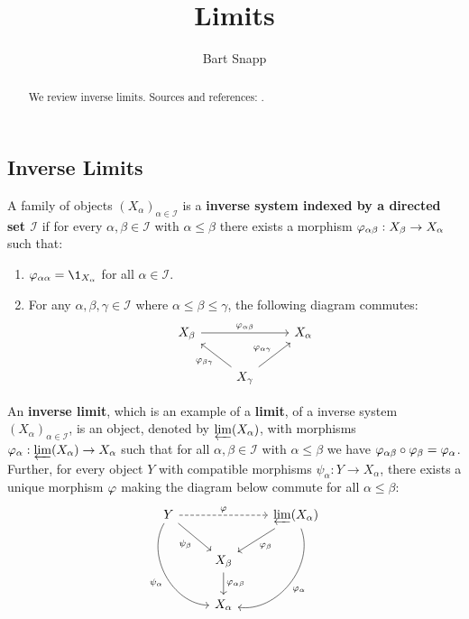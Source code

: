 \documentclass{ximera}
\author{Bart Snapp}
\title{Limits}
\begin{document}
  \begin{abstract}
    We review inverse limits.  Sources and references: \cite{sD2008}.
  \end{abstract}
\maketitle

\subsection{Inverse Limits}

\begin{definition}
  A family of objects $(X_\alpha)_{\alpha\in \mathcal{I}}$ is a \textbf{inverse
    system indexed by a directed set $\boldsymbol{\mathcal{I}}$} if for every
  $\alpha,\beta \in \mathcal{I}$ with $\alpha \le \beta$ there exists a
  morphism $\varphi_{\alpha\beta}:X_\beta \to X_\alpha$ such that:
  \begin{enumerate}
  \item $\ph_{\alpha\alpha} = \1_{X_\alpha}$ for all $\alpha \in \mathcal{I}$.
  \item For any $\alpha,\beta,\gamma \in \mathcal{I}$ where $\alpha\le \beta\le\gamma$, the following diagram commutes:
    \[
    \begin{tikzcd}
      X_\beta \ar[rr,"\ph_{\alpha\beta}"] &    & X_\alpha\\
      &  X_\gamma\ar[ul,"\ph_{\beta\gamma}"] \ar[ur,"\ph_{\alpha\gamma}"]  &
    \end{tikzcd}
    \]
  \end{enumerate}
\end{definition}


\begin{definition}
  An \textbf{inverse limit}, which is an example of a \textbf{limit},
  of a inverse system $(X_\alpha)_{\alpha\in \mathcal{I}}$, is an
  object, denoted by $\varprojlim(X_\alpha)$, with morphisms
  $\varphi_\alpha:\varprojlim(X_\alpha)\to X_\alpha$ such that for all
  $\alpha, \beta \in \mathcal{I}$ with $\alpha \le \beta$ we have
  $\varphi_{\alpha\beta} \circ \varphi_\beta = \varphi_\alpha$.  Further, for
  every object $Y$ with compatible morphisms $\psi_\alpha:Y\to
  X_\alpha$, there exists a unique morphism $\varphi$ making the diagram
  below commute for all $\alpha\le\beta$:
\[
\begin{tikzcd}
  Y\ar[ddr,bend right=60,swap,"\psi_\alpha"] \ar[dr,swap,"\psi_\beta"]  \ar[dashed,rr,"\ph"] &   &  \invlim(X_{\alpha}) \ar[ddl,bend left=60,"\ph_\alpha"] \ar[dl,"\ph_\beta"]\\
  & X_{\beta} \ar[d,"\ph_{\alpha\beta}"] &\\
  & X_{\alpha}&
\end{tikzcd}
\]
\end{definition}
\end{document}
